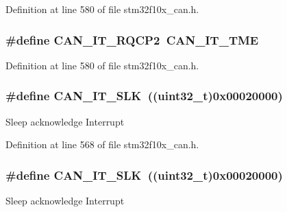 Definition at line 580 of file stm32f10x\+\_\+can.\+h.

\subsubsection[{\texorpdfstring{C\+A\+N\+\_\+\+I\+T\+\_\+\+R\+Q\+C\+P2}{CAN_IT_RQCP2}}]{\setlength{\rightskip}{0pt plus 5cm}\#define C\+A\+N\+\_\+\+I\+T\+\_\+\+R\+Q\+C\+P2~{\bf C\+A\+N\+\_\+\+I\+T\+\_\+\+T\+ME}}\hypertarget{group___c_a_n__interrupts_gacc634c3e29cdc9622081021dcda3127b}{}\label{group___c_a_n__interrupts_gacc634c3e29cdc9622081021dcda3127b}


Definition at line 580 of file stm32f10x\+\_\+can.\+h.

\subsubsection[{\texorpdfstring{C\+A\+N\+\_\+\+I\+T\+\_\+\+S\+LK}{CAN_IT_SLK}}]{\setlength{\rightskip}{0pt plus 5cm}\#define C\+A\+N\+\_\+\+I\+T\+\_\+\+S\+LK~(({\bf uint32\+\_\+t})0x00020000)}\hypertarget{group___c_a_n__interrupts_ga639d4ab2777d9a2f8b7e67071b091059}{}\label{group___c_a_n__interrupts_ga639d4ab2777d9a2f8b7e67071b091059}
Sleep acknowledge Interrupt 

Definition at line 568 of file stm32f10x\+\_\+can.\+h.

\subsubsection[{\texorpdfstring{C\+A\+N\+\_\+\+I\+T\+\_\+\+S\+LK}{CAN_IT_SLK}}]{\setlength{\rightskip}{0pt plus 5cm}\#define C\+A\+N\+\_\+\+I\+T\+\_\+\+S\+LK~(({\bf uint32\+\_\+t})0x00020000)}\hypertarget{group___c_a_n__interrupts_ga639d4ab2777d9a2f8b7e67071b091059}{}\label{group___c_a_n__interrupts_ga639d4ab2777d9a2f8b7e67071b091059}
Sleep acknowledge Interrupt 


